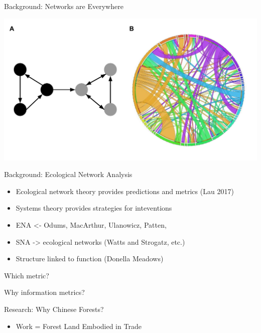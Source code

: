 \documentclass[ignorenonframetext,]{beamer}
\providecommand{\tightlist}{%
  \setlength{\itemsep}{0pt}\setlength{\parskip}{0pt}}
\begin{document}
\begin{frame}{Background: Networks are Everywhere}
\protect\hypertarget{background-networks-are-everywhere-1}{}

\begin{center}\includegraphics[width=0.5\linewidth]{images/example_network} \end{center}

\end{frame}

\begin{frame}{Background: Ecological Network Analysis}
\protect\hypertarget{background-ecological-network-analysis}{}

\begin{itemize}
\tightlist
\item
  Ecological network theory provides predictions and metrics (Lau 2017)
\item
  Systems theory provides strategies for inteventions
\item
  ENA \textless{}- Odums, MacArthur, Ulanowicz, Patten,
\item
  SNA -\textgreater{} ecological networks (Watts and Strogatz, etc.)
\item
  Structure linked to function (Donella Meadows)
\end{itemize}

\end{frame}

\begin{frame}{Which metric?}
\protect\hypertarget{which-metric}{}

\end{frame}

\begin{frame}{Why information metrics?}
\protect\hypertarget{why-information-metrics}{}

\end{frame}

\begin{frame}{Research: Why Chinese Forests?}
\protect\hypertarget{research-why-chinese-forests}{}

\begin{itemize}
\tightlist
\item
  Work = Forest Land Embodied in Trade
\end{itemize}

\end{frame}
\end{document}
